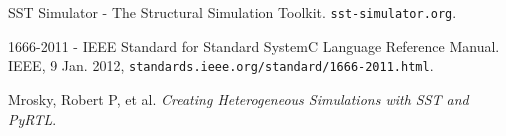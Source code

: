 \documentclass{article}
\begin{document}
  \begin{thebibliography}{5}

     SST Simulator - The Structural Simulation Toolkit. \texttt{sst-simulator.org}.

     1666-2011 - IEEE Standard for Standard SystemC Language Reference Manual. IEEE, 9 Jan. 2012, \texttt{standards.ieee.org/standard/1666-2011.html}.

     Mrosky, Robert P, et al. \textit{Creating Heterogeneous Simulations with SST and PyRTL}.


  \end{thebibliography}
\end{document}
